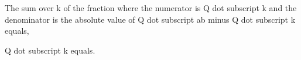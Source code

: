 The sum over k of the fraction where the numerator is Q dot subscript k and the denominator is the absolute value of Q dot subscript ab minus Q dot subscript k equals,

Q dot subscript k equals.